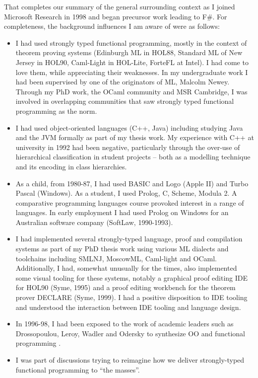 \documentclass[acmsmall,review]{acmart}\settopmatter{printfolios=true,printccs=false,printacmref=false}
\begin{document}
That completes our summary of the general surrounding context as I joined Microsoft Research in 1998 and began precursor work leading to F\#. For completeness, the background influences I am aware of were as follows:

\begin{itemize}
\item I had used strongly typed functional programming, mostly in the context of theorem proving systems (Edinburgh ML in HOL88, Standard ML of New Jersey in HOL90, Caml-Light in HOL-Lite, ForteFL at Intel). I had come to love them, while appreciating their weaknesses. In my undergraduate work I had been supervised by one of the originators of ML, Malcolm Newey. Through my PhD work, the OCaml community and MSR Cambridge, I was involved in overlapping communities that saw strongly typed functional programming as the norm.
\item I had used object-oriented languages (C++, Java) including studying Java and the JVM formally as part of my thesis work.  My experience with C++ at university in 1992 had been negative, particularly through the over-use of hierarchical classification in student projects – both as a modelling technique and its encoding in class hierarchies.  
\item As a child, from 1980-87, I had used BASIC and Logo (Apple II) and Turbo Pascal (Windows). As a student, I used Prolog, C, Scheme, Modula 2. A comparative programming languages course provoked interest in a range of languages. In early employment I had used Prolog on Windows for an Australian software company (SoftLaw, 1990-1993). 
\item I had implemented several strongly-typed language, proof and compilation systems as part of my PhD thesis work using various ML dialects and toolchains including SMLNJ, MoscowML, Caml-light and OCaml. Additionally, I had, somewhat unusually for the times, also implemented some visual tooling for these systems, notably a graphical proof editing IDE for HOL90 (Syme, 1995) and a proof editing workbench for the theorem prover DECLARE (Syme, 1999).  I had a positive disposition to IDE tooling and understood the interaction between IDE tooling and language design.
\item In 1996-98, I had been exposed to the work of academic leaders such as Drossopoulou, Leroy, Wadler and Odersky to synthesize OO and functional programming \citep{alvesfoss99}.
\item I was part of discussions trying to reimagine how we deliver strongly-typed functional programming to “the masses”.
\end{itemize}
\end{document}
